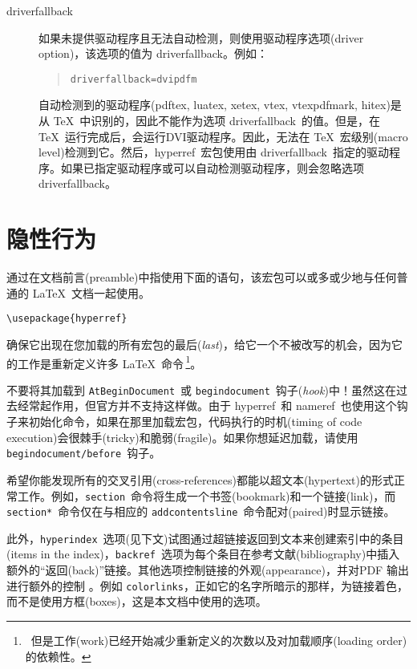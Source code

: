 \documentclass{article}
\newcommand*{\xpackage}[1]{\textsf{#1}}
\newcommand{\bs}{\symbol{'134}}%
\newcommand{\ci}[1]{\texttt{\bs#1}}
\begin{document}
\begin{description}
  \item[driverfallback]
        如果未提供驱动程序且无法自动检测，则使用驱动程序选项(driver option)，该选项的值为 \textsf{driverfallback}。例如：
        \begin{quote}
          \texttt{driverfallback=dvipdfm}
        \end{quote}
        自动检测到的驱动程序(\textsf{pdftex}, \textsf{luatex}, \textsf{xetex}, \textsf{vtex}, \textsf{vtexpdfmark}, \textsf{hitex})是从 \TeX\ 中识别的，因此不能作为选项 \textsf{driverfallback}\ 的值。但是，在 \TeX\ 运行完成后，会运行DVI驱动程序。因此，无法在 \TeX\ 宏级别(macro level)检测到它。然后，\xpackage{hyperref}\ 宏包使用由 \textsf{driverfallback}\ 指定的驱动程序。如果已指定驱动程序或可以自动检测驱动程序，则会忽略选项 \textsf{driverfallback}。
\end{description}

\newpage
\section{\heiti 隐性行为}

通过在文档前言(preamble)中指使用下面的语句，该宏包可以或多或少地与任何普通的 \LaTeX\ 文档一起使用。
{\large \color{blue}
\begin{verbatim}
\usepackage{hyperref}
\end{verbatim} }

确保它出现在您加载的所有宏包的{\kaiti 最后}(\emph{last})，给它一个不被改写的机会，因为它的工作是重新定义许多 \LaTeX\ 命令\,\footnote{\ 但是工作(work)已经开始减少重新定义的次数以及对加载顺序(loading order)的依赖性。}。

{\kaiti 不要将其加载到} \ci{AtBeginDocument}\ {\kaiti 或} \texttt{begindocument}\ {\kaiti 钩子}(\emph{hook}){\kaiti 中！}虽然这在过去经常起作用，但官方并不支持这样做。由于 \xpackage{hyperref}\ 和 \xpackage{nameref}\ 也使用这个钩子来初始化命令，如果在那里加载宏包，代码执行的时机(timing of code execution)会很棘手(tricky)和脆弱(fragile)。如果你想延迟加载，请使用 \texttt{begindocument/before}\ 钩子。

希望你能发现所有的交叉引用(cross-references)都能以超文本(hypertext)的形式正常工作。例如，\ci{section}\ 命令将生成一个书签(bookmark)和一个链接(link)，而 \ci{section*}\ 命令仅在与相应的 \ci{addcontentsline}\ 命令配对(paired)时显示链接。

此外，\texttt{hyperindex}\ 选项(见下文)试图通过超链接返回到文本来创建索引中的条目(items in the index)，\texttt{backref}\ 选项为每个条目在参考文献(bibliography)中插入额外的“返回(back)”链接。其他选项控制链接的外观(appearance)，并对PDF 输出进行额外的控制 。例如 \texttt{colorlinks}，正如它的名字所暗示的那样，为链接着色，而不是使用方框(boxes)，这是本文档中使用的选项。
\end{document}
